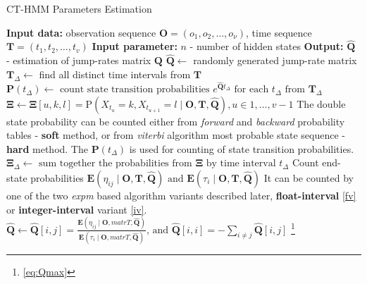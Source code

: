 \documentclass[thesis=M,english]{FITthesis}[2012/10/20]
\newcommand{\matr}[1]{\mathbf{#1}}
\begin{document}
\noindent\begin{minipage}{\textwidth} 
\renewcommand\footnoterule{}
\begin{algorithm}[H]
\caption{CT-HMM Parameters Estimation}\label{pe} 
\begin{algorithmic}[1]
\State \textbf{Input data:} observation sequence $\matr{O} = (o_1,o_2,\dots,o_{\nu})$, time sequence $\matr{T} = (t_1,t_2,\dots,t_v)$
\State \textbf{Input parameter:} $n$ - number of hidden states
\State \textbf{Output:} $\matr{\hat{Q}}$ - estimation of jump-rates matrix $\matr{Q}$
\State $\matr{\hat{Q}} \gets$ randomly generated jump-rate matrix
\State $\matr{T}_{\Delta} \gets$ find all distinct time intervals from $\matr{T}$
\Repeat
\State $\matr{P}({t_{\Delta}}) \gets \text{ count state transition probabilities } e^{\matr{\hat Q}t_{\Delta}} \text{ for each } t_{\Delta} \text{ from } \matr{T}_{\Delta}$
\State $\matr{\Xi} \gets \matr{\Xi}[u,k,l] = \mathrm{P}( X_{t_u} = k, X_{t_{u+1}} = l \mid \matr{O},\matr{T}, \matr{ \hat Q }),  u \in 1,\dots,v-1$
\State \Comment The double state probability can be counted either from \textit{forward} and \textit{backward} probability tables - \textbf{soft} method, or from \textit{viterbi} algorithm most probable state sequence - \textbf{hard} method. The $\matr{P}({t_{\Delta}})$ is used for counting of state transition probabilities. 
\State $\matr{\Xi}_{\Delta} \gets \text{ sum together the probabilities from } \matr{\Xi} \text{ by time interval } t_{\Delta}  $
\State Count end-state probabilities $\mathbf{E}(\eta_{ij} \mid \matr{O}, \matr{T}, \matr{ \hat Q } ) \text{ and } \mathbf{E}(\tau_{i} \mid \matr{O}, \matr{T}, \matr{ \hat Q })$
\State \Comment It can be counted by one of the two \textit{expm} based algorithm variants described later, \textbf{float-interval} \ref{fv} or \textbf{integer-interval} variant \ref{iv}.  
\State $\matr{\hat{Q}} \gets \matr{\hat{Q}}[i,j] = \frac{\mathbf{E}(\eta_{ij} \mid \matr{O}, matr{T}, \matr{ \hat Q } )}{\mathbf{E}(\tau_{i} \mid \matr{O}, matr{T}, \matr{ \hat Q })} \text{, and } \matr{\hat{Q}}[i,i] =  - \sum_{i \neq j} \matr{\hat{Q}}[i,j]$ \footnote{\label{refqmax}\eqref{eq:Qmax}}

\EndProcedure
\end{algorithmic}

\end{algorithm}

\end{minipage}
\end{document}
